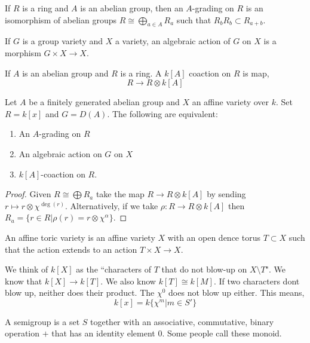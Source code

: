 \documentclass[12pt]{amsart}
\begin{document}
\begin{definition}
    If $R$ is a ring and $A$ is an abelian group, then an $A$-grading on $R$ is an isomorphism of abelian groups $R \cong \bigoplus_{a \in A} R_a$ such that $R_bR_b \subset R_{a+b}$. 
\end{definition}

\begin{definition}
        If $G$ is a group variety and $X$ a variety, an algebraic action of $G$ on $X$ is a morphism $G \times X \to X$. 
\end{definition}

\begin{definition}
    If $A$ is an abelian group and $R$ is a ring. A $k[A]$ coaction on $R$ is map, 
    \[ R \to R \otimes k[A]\]
\end{definition}

\begin{theorem}
    Let $A$ be a finitely generated abelian group and $X$ an affine variety over $k$. Set $R = k[x]$ and $G = D(A)$. The following are equivalent: 
    \begin{enumerate}
        \item An $A$-grading on $R$
        \item An algebraic action on $G$ on $X$
        \item $k[A]$-coaction on $R$. 
    \end{enumerate}
\end{theorem}
\begin{proof}
    Given $R \cong \bigoplus R_a$ take the map $R \to R \otimes k[A]$ by sending $r \mapsto r \otimes \chi^{\deg(r)}$. Alternatively, if we take $\rho: R \to R\otimes k[A]$ then $R_a = \{r \in R | \rho(r) = r \otimes \chi^\alpha \}$. 
\end{proof}

\begin{definition}
    An affine toric variety is an affine variety $X$ with an open dence torus $T \subset X$ such that the action extends to an action $T \times X \to X$. 
\end{definition}

We think of $k[X]$ as the ``characters of $T$ that do not blow-up on $X \setminus T$". We know that $k[X] \to k[T]$. We also know $k[T] \cong k[M]$. If two characters dont blow up, neither does their product. The $\chi^0$ does not blow up either. This means,
\[k [x] = k\{\chi^m | m \in S'\}\]

\begin{definition}
    A semigroup is a set $S$ together with an associative, commutative, binary operation $+$ that has an identity element $0$. Some people call these monoid. 
\end{definition}
\end{document}
